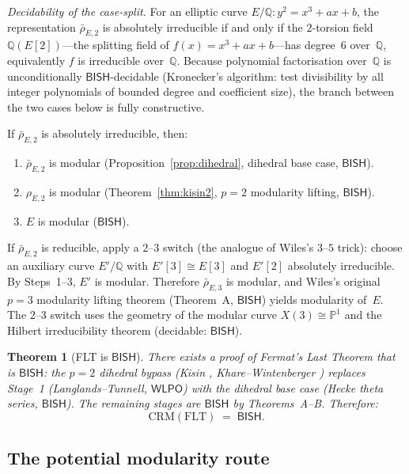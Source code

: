 \documentclass[11pt]{article}
\theoremstyle{plain}
\newtheorem{theorem}{Theorem}[section]
\theoremstyle{definition}
\theoremstyle{remark}
\newcommand{\Q}{\mathbb{Q}}
\newcommand{\CRM}{\mathrm{CRM}}
\newcommand{\BISH}{\mathsf{BISH}}
\newcommand{\WLPO}{\mathsf{WLPO}}
\begin{document}
\emph{Decidability of the case-split.}  For an elliptic curve
$E/\Q\colon y^2 = x^3 + ax + b$, the representation
$\bar{\rho}_{E,2}$ is absolutely irreducible if and only if the
$2$-torsion field $\Q(E[2])$---the splitting field of
$f(x) = x^3 + ax + b$---has degree~$6$ over~$\Q$, equivalently
$f$ is irreducible over~$\Q$.  Because polynomial factorisation
over~$\Q$ is unconditionally $\BISH$-decidable (Kronecker's
algorithm: test divisibility by all integer polynomials of
bounded degree and coefficient size), the branch between the two
cases below is fully constructive.

If $\bar{\rho}_{E,2}$ is absolutely irreducible, then:
\begin{enumerate}[nosep]
\item $\bar{\rho}_{E,2}$ is modular (Proposition~\ref{prop:dihedral},
  dihedral base case, $\BISH$).
\item $\rho_{E,2}$ is modular (Theorem~\ref{thm:kisin2},
  $p = 2$ modularity lifting, $\BISH$).
\item $E$ is modular ($\BISH$).
\end{enumerate}

If $\bar{\rho}_{E,2}$ is reducible, apply a $2$--$3$ switch
(the analogue of Wiles's $3$--$5$ trick): choose an auxiliary
curve $E'/\Q$ with $E'[3] \cong E[3]$ and $E'[2]$ absolutely
irreducible.  By Steps~1--3, $E'$ is modular.  Therefore
$\bar{\rho}_{E,3}$ is modular, and Wiles's original $p = 3$
modularity lifting theorem (Theorem~A, $\BISH$) yields
modularity of~$E$.  The $2$--$3$ switch uses the geometry of
the modular curve $X(3) \cong \mathbb{P}^1$ and the Hilbert
irreducibility theorem (decidable: $\BISH$).

\begin{theorem}[FLT is $\BISH$]%
\label{thm:flt-bish}
There exists a proof of Fermat's Last Theorem that is
$\BISH$: the $p = 2$ dihedral bypass (Kisin \cite{Kisin2009},
Khare--Wintenberger \cite{KhareWintenberger2009I}) replaces
Stage~1 (Langlands--Tunnell, $\WLPO$) with the dihedral base
case (Hecke theta series, $\BISH$).  The remaining stages are
$\BISH$ by Theorems~A--B.  Therefore:
\[
  \CRM(\mathrm{FLT}) \;=\; \BISH.
\]
\end{theorem}

\subsection{The potential modularity route}
\end{document}
